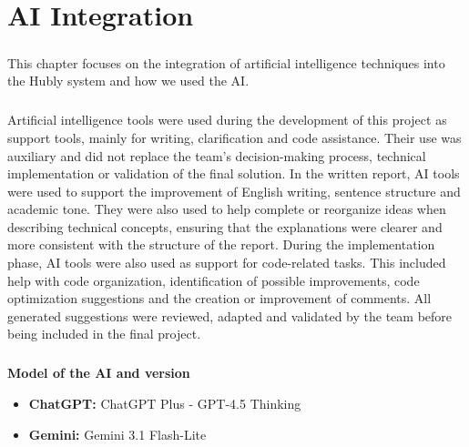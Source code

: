 \chapter{AI Integration}\label{ch:ai}
\paragraph{}This chapter focuses on the integration of artificial intelligence techniques into the Hubly system and how we used the AI.


\paragraph{}Artificial intelligence tools were used during the development of this project as support tools, mainly for writing, clarification and code assistance. Their use was auxiliary and did not replace the team's decision-making process, technical implementation or validation of the final solution.
In the written report, AI tools were used to support the improvement of English writing, sentence structure and academic tone. They were also used to help complete or reorganize ideas when describing technical concepts, ensuring that the explanations were clearer and more consistent with the structure of the report.
During the implementation phase, AI tools were also used as support for code-related tasks. This included help with code organization, identification of possible improvements, code optimization suggestions and the creation or improvement of comments. All generated suggestions were reviewed, adapted and validated by the team before being included in the final project.

\paragraph{}\textbf{Model of the AI and version}

\begin{itemize}

\item \textbf{ChatGPT:} ChatGPT Plus - GPT-4.5 Thinking

\item \textbf{Gemini:} Gemini 3.1 Flash-Lite

\end{itemize}
